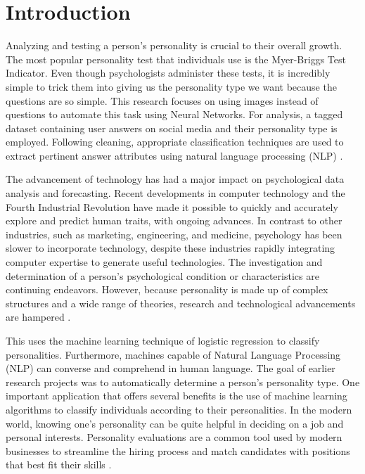 \documentclass[conference]{IEEEtran}
\begin{document}
    \section{Introduction}
    Analyzing and testing a person's personality is crucial to their overall growth. The most
    popular personality test that individuals use is the Myer-Briggs Test Indicator. Even though psychologists
    administer these tests, it is incredibly simple to trick them into giving us the personality
    type we want because the questions are so simple. This research focuses on using images instead of
    questions to automate this task using Neural Networks. For analysis, a tagged dataset containing
    user answers on social media and their personality type is employed. Following cleaning, appropriate
    classification techniques are used to extract pertinent answer attributes using natural language
    processing (NLP) \cite{b1}.

    The advancement of technology has had a major impact on psychological data analysis and forecasting.
    Recent developments in computer technology and the Fourth Industrial Revolution have made it
    possible to quickly and accurately explore and predict human traits, with ongoing advances. In
    contrast to other industries, such as marketing, engineering, and medicine, psychology has been
    slower to incorporate technology, despite these industries rapidly integrating computer expertise
    to generate useful technologies. The investigation and determination of a person's psychological
    condition or characteristics are continuing endeavors. However, because personality is made up
    of complex structures and a wide range of theories, research and technological advancements are hampered
    \cite{b2}.

    This uses the machine learning technique of logistic regression to classify personalities.
    Furthermore, machines capable of Natural Language Processing (NLP) can converse and comprehend in
    human language. The goal of earlier research projects was to automatically determine a person's
    personality type. One important application that offers several benefits is the use of machine learning
    algorithms to classify individuals according to their personalities. In the modern world, knowing
    one's personality can be quite helpful in deciding on a job and personal interests. Personality
    evaluations are a common tool used by modern businesses to streamline the hiring process and
    match candidates with positions that best fit their skills \cite{b3}.
\end{document}
